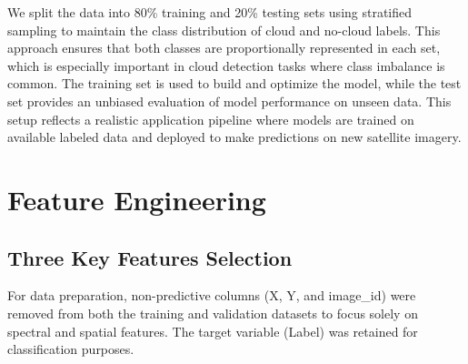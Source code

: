 \documentclass[11pt,letterpaper]{article}
\begin{document}
We split the data into 80\% training and 20\% testing sets using stratified sampling to maintain the class distribution of cloud and no-cloud labels. This approach ensures that both classes are proportionally represented in each set, which is especially important in cloud detection tasks where class imbalance is common. The training set is used to build and optimize the model, while the test set provides an unbiased evaluation of model performance on unseen data. This setup reflects a realistic application pipeline where models are trained on available labeled data and deployed to make predictions on new satellite imagery.

\newpage

\vspace{1em} %
\section{Feature Engineering}

\vspace{1em} %
\subsection{Three Key Features Selection}
\vspace{0.5em} %


For data preparation, non-predictive columns (X, Y, and image\_id) were removed from both the training and validation datasets to focus solely on spectral and spatial features. The target variable (Label) was retained for classification purposes. 
\vspace{1em} %
\end{document}
